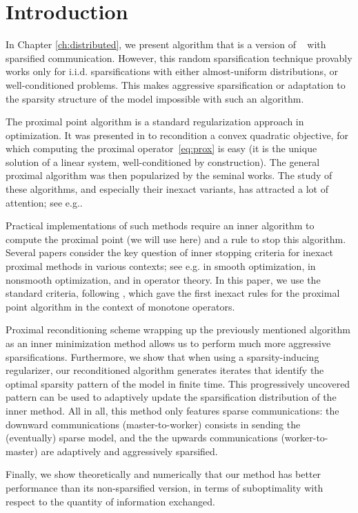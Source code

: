 \section{Introduction}
In Chapter \ref{ch:distributed}, we present \salgo algorithm that is a version of \dave~\cite{ICML18} with sparsified communication. However, this random sparsification technique provably works only for i.i.d. sparsifications with either almost-uniform distributions, or well-conditioned problems. This makes aggressive sparsification or adaptation to the sparsity structure of the model impossible with such an algorithm.

The proximal point algorithm is a standard regularization approach in optimization. It was presented in \cite[Chap.\,5]{bkl} to recondition a convex quadratic objective, for which computing the proximal operator~\eqref{eq:prox} is easy (it is the unique solution of a linear system, well-conditioned by construction). The general proximal algorithm was then popularized by the seminal works\;\cite{martinet-1970,rockafellar1976monotone}. The study of these algorithms, and especially their inexact variants, has attracted a lot of attention; see e.g.\;\cite{guler1992new,solodov2000error,fuentes,lin2017catalyst,lin2019inexact}. 

Practical implementations of such methods require an inner algorithm to compute the proximal point (we will use \salgo here) and a rule to stop this algorithm. Several papers consider the key question of inner stopping criteria for inexact proximal methods in various contexts; see e.g.\;\cite{fuentes} in smooth optimization, \cite{lemarechal-sagastizabal-1997} in nonsmooth optimization,
and \cite{solodov-svaiter-2001} in operator theory. In this paper, we use the standard criteria, following \cite{rockafellar1976monotone}, which gave the first inexact rules for the proximal point algorithm in the context of monotone operators.

Proximal reconditioning scheme wrapping up the previously mentioned algorithm as an inner minimization method allows us to perform much more aggressive sparsifications. Furthermore, we show that when using a sparsity-inducing regularizer, our reconditioned algorithm generates iterates that identify the optimal sparsity pattern of the model in finite time. This progressively uncovered pattern can be used to adaptively update the sparsification distribution of the inner method. All in all, this method only features sparse communications: the downward communications (master-to-worker) consists in sending the (eventually) sparse model, and the the upwards communications (worker-to-master) are adaptively and aggressively sparsified.

Finally, we show theoretically and numerically that our method has better performance than its non-sparsified version, in terms of suboptimality with respect to the quantity of information exchanged.